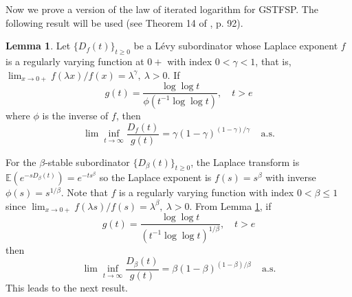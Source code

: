 \documentclass[11pt,oneside,reqno]{amsart}
\theoremstyle{definition}
\newtheorem{theorem}{\bf Theorem}[section]
\newtheorem{lemma}{Lemma}[section]
\theoremstyle{remarkstyle}
\begin{document}
Now we prove a version of the law of iterated logarithm for GSTFSP. The following result will be used (see Theorem 14 of \cite{Bertoin2004}, p. 92).

\begin{lemma}\label{lil.Subordinator}
Let $\{D_f(t)\}_{t\ge 0}$ be a L\'{e}vy subordinator whose Laplace exponent $f$ is a regularly varying function at $0+$ with index $0<\gamma <1$, that is, $\lim_{x\rightarrow 0+}f(\lambda x)/f(x)=\lambda^{\gamma},~\lambda>0$. If
\begin{equation*}
g(t)=\frac{\log\log t}{\phi(t^{-1}\log\log t)}, \quad t>e
\end{equation*}
where $\phi$ is the inverse of $f$, then
\begin{equation*}
\lim\inf_{t\rightarrow\infty}\frac{D_f(t)}{g(t)} = \gamma(1-\gamma)^{(1-\gamma)/\gamma}~~~~~\text{a.s.} 
\end{equation*}
\end{lemma}
For the $\beta$-stable subordinator $\{D_{\beta}(t)\}_{t\ge 0}$, the Laplace transform is $\mathbb{E}(e^{-sD_{\beta}(t)})=e^{-ts^{\beta}}$ so the Laplace exponent is $f(s)=s^{\beta}$ with inverse $\phi(s)=s^{1/\beta}$. Note that $f$ is a regularly varying function with index $0<\beta\le 1$ since $\lim_{x\rightarrow 0+}f(\lambda s)/f(s)=\lambda^{\beta},~\lambda>0$. From Lemma \ref{lil.Subordinator}, if
\begin{equation*}
g(t)=\frac{\log\log t}{(t^{-1}\log\log t)^{1/\beta}}, \quad t>e   
\end{equation*}
then
\begin{equation*}
\lim\inf_{t\rightarrow\infty}\frac{D_\beta(t)}{g(t)} = \beta(1-\beta)^{(1-\beta)/\beta}~~~~~\text{a.s.} 
\end{equation*}
This leads to the next result.
\end{document}
